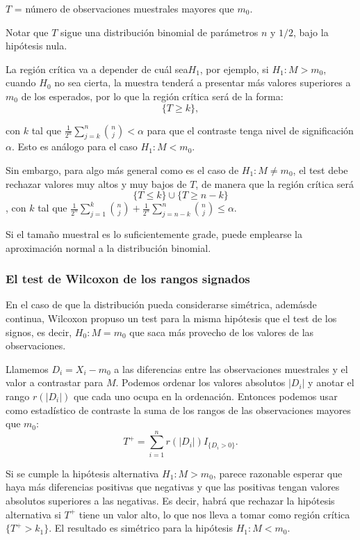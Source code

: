 \documentclass[a4paper,12pt]{article}
\begin{document}
\begin{center}
$T$ = número de observaciones muestrales mayores que $m_0$.
\end{center}

Notar que $T$ sigue una distribución binomial de parámetros $n$ y $1/2$, bajo la hipótesis nula.

La región crítica va a depender de cuál sea$H_1$, por ejemplo, si $H_1:M>m_0$, cuando $H_0$ no sea cierta, la muestra tenderá a presentar más valores superiores a $m_0$ de los esperados, por lo que la región crítica será de la forma:
$$\{T\geq k \},$$

con $k$ tal que $\frac{1}{2^n}\sum_{j=k}^{n} \binom{n}{j} < \alpha$ para que el contraste tenga nivel de significación $\alpha$. Esto es análogo para el caso $H_1: M< m_0$.

Sin embargo, para algo más general como es el caso de $H_1:M\neq m_0$, el test debe rechazar valores muy altos y muy bajos de $T$, de manera que la región crítica será $$\{T\leq k\}\cup \{T\geq n - k \}$$, con $k$ tal que $\frac{1}{2^n}\sum_{j=1}^{k} \binom{n}{j} + \frac{1}{2^n}\sum_{j=n-k}^{n} \binom{n}{j} \leq \alpha$.

Si el tamaño muestral es lo suficientemente grade, puede emplearse la aproximación normal a la distribución binomial.

\subsubsection{El test de Wilcoxon de los rangos signados}
En el caso de que la distribución pueda considerarse simétrica, ademásde continua, Wilcoxon propuso un test para la misma hipótesis que el test de los signos, es decir, $H_0:M =m_0$ que saca más provecho de los valores de las observaciones.

Llamemos $D_i=X_i - m_0$ a las diferencias entre las observaciones muestrales y el valor a contrastar para $M$. Podemos ordenar los valores absolutos $|D_i|$ y anotar el rango $r(|D_i|)$ que cada uno ocupa en la ordenación.  Entonces podemos usar como estadístico de contraste la suma de los rangos de las observaciones mayores que $m_0$:
$$T^+ = \sum_{i =1}^{n} r(|D_i|)I_{\{D_i>0\}}.$$

Si se cumple la hipótesis alternativa $H_1:M>m_0$, parece razonable esperar que haya más diferencias positivas que negativas y que las positivas tengan valores absolutos superiores a las negativas. Es decir, habrá que rechazar la hipótesis alternativa si $T^+$ tiene un valor alto, lo que nos lleva a tomar como región crítica $\{T^+ > k_1\}$. El resultado es simétrico para la hipótesis $H_1:M<m_0$.
\end{document}
